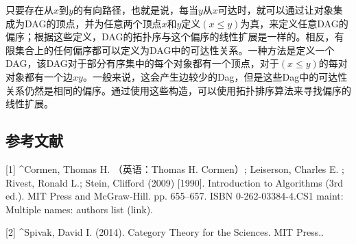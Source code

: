 只要存在从$x$到$y$的有向路径，也就是说，每当$y$从$x$可达时，就可以通过让对象集成为DAG的顶点，并为任意两个顶点$x$和$y$定义$(x\leq y)$为真，来定义任意DAG的偏序；根据这些定义，DAG的拓扑序与这个偏序的线性扩展是一样的。相反，有限集合上的任何偏序都可以定义为DAG中的可达性关系。一种方法是定义一个DAG，该DAG对于部分有序集中的每个对象都有一个顶点，对于$(x\leq y)$的每对对象都有一个边$xy$。一般来说，这会产生边较少的Dag，但是这些Dag中的可达性关系仍然是相同的偏序。通过使用这些构造，可以使用拓扑排序算法来寻找偏序的线性扩展。

\subsection{参考文献}
[1]
^Cormen, Thomas H. （英语：Thomas H. Cormen）; Leiserson, Charles E. ; Rivest, Ronald L.; Stein, Clifford (2009) [1990]. Introduction to Algorithms (3rd ed.). MIT Press and McGraw-Hill. pp. 655–657. ISBN 0-262-03384-4.CS1 maint: Multiple names: authors list (link).

[2]
^Spivak, David I. (2014). Category Theory for the Sciences. MIT Press..